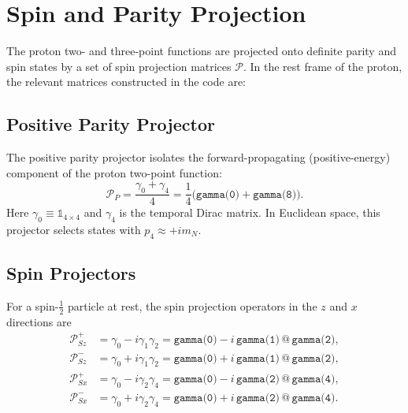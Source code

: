 \documentclass[11pt,a4paper]{article}
\newcommand{\PolProj}{\mathcal{P}}
\begin{document}
\section{Spin and Parity Projection}

The proton two- and three-point functions are projected onto definite parity and
spin states by a set of spin projection matrices $\PolProj$.  In the rest frame
of the proton, the relevant matrices constructed in the code are:

\subsection{Positive Parity Projector}

The positive parity projector isolates the forward-propagating (positive-energy)
component of the proton two-point function:
\begin{equation}
  \PolProj_{P} = \frac{\gamma_{0} + \gamma_{4}}{4}
               = \frac{1}{4}\big(\texttt{gamma(0)} + \texttt{gamma(8)}\big).
\end{equation}
Here $\gamma_{0} \equiv \mathbb{1}_{4\times 4}$ and $\gamma_{4}$ is the temporal
Dirac matrix.  In Euclidean space, this projector selects states with
$p_{4} \approx +im_{N}$.

\subsection{Spin Projectors}

For a spin-$\tfrac{1}{2}$ particle at rest, the spin projection operators in the
$z$ and $x$ directions are
\begin{align}
  \PolProj_{Sz}^{+} &= \gamma_{0} - i\gamma_{1}\gamma_{2}
                     = \texttt{gamma(0)} - i\,\texttt{gamma(1)}\,\texttt{@}\,\texttt{gamma(2)},
  \label{eq:Szp} \\
  \PolProj_{Sz}^{-} &= \gamma_{0} + i\gamma_{1}\gamma_{2}
                     = \texttt{gamma(0)} + i\,\texttt{gamma(1)}\,\texttt{@}\,\texttt{gamma(2)},
  \label{eq:Szm} \\
  \PolProj_{Sx}^{+} &= \gamma_{0} - i\gamma_{2}\gamma_{4}
                     = \texttt{gamma(0)} - i\,\texttt{gamma(2)}\,\texttt{@}\,\texttt{gamma(4)},
  \label{eq:Sxp} \\
  \PolProj_{Sx}^{-} &= \gamma_{0} + i\gamma_{2}\gamma_{4}
                     = \texttt{gamma(0)} + i\,\texttt{gamma(2)}\,\texttt{@}\,\texttt{gamma(4)}.
  \label{eq:Sxm}
\end{align}
\end{document}
